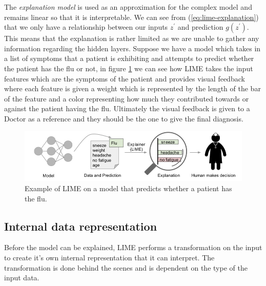 The \emph{explanation model} is used as an approximation for the complex model and remains linear so that it is interpretable. We can see from (\ref{eq:lime-explanation}) that we only have a relationship between our inputs $z^{'}$ and prediction $g(z^{'})$. This means that the explanation is rather limited as we are unable to gather any information regarding the hidden layers. Suppose we have a model which takes in a list of symptoms that a patient is exhibiting and attempts to predict whether the patient has the flu or not, in figure \ref{fig:lime-process} we can see how LIME takes the input features which are the symptoms of the patient and provides visual feedback where each feature is given a weight which is represented by the length of the bar of the feature and a color representing how much they contributed towards or against the patient having the flu. Ultimately the visual feedback is given to a Doctor as a reference and they should be the one to give the final diagnosis.




\begin  {figure} [!htbp]
  \includegraphics[width=\linewidth]{Evaluation_Images/Lime_Process.jpg}
  \caption{Example of LIME on a model that predicts whether a patient has the flu. \cite{lime}}
  \label{fig:lime-process}
\end{figure}


\subsection{Internal data representation} \label{sect-Internal} Before the model can be explained, LIME performs a transformation on the input to create it's own internal representation that it can interpret. The transformation is done behind the scenes and is dependent on the type of the input data.

